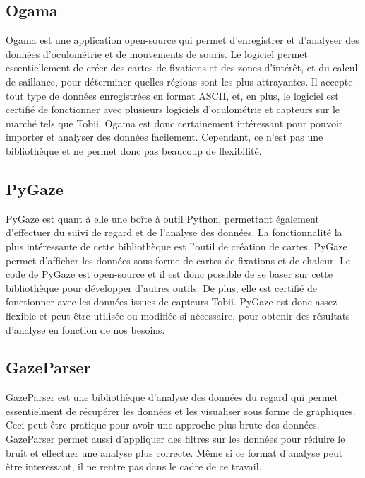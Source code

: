 \documentclass[hidelinks,12pt]{article}
\begin{document}
\subsection{Ogama}

Ogama \cite{ogama} est une application open-source qui permet d'enregistrer et
d'analyser des données d'oculométrie et de mouvements de souris. Le logiciel
permet essentiellement de créer des cartes de fixations et des zones d'intérêt,
et du calcul de saillance, pour déterminer quelles régions sont les plus
attrayantes. Il accepte tout type de données enregistrées en format ASCII, et,
en plus, le logiciel est certifié de fonctionner avec plusieurs logiciels
d'oculométrie et capteurs sur le marché tels que Tobii. Ogama est donc
certainement intéressant pour pouvoir importer et analyser des données
facilement. Cependant, ce n'est pas une bibliothèque et ne permet donc pas
beaucoup de flexibilité.

\subsection{PyGaze}

PyGaze \cite{pygaze} est quant à elle une boîte à outil Python, permettant
également d'effectuer du suivi de regard et de l'analyse des données. La
fonctionnalité la plus intéressante de cette bibliothèque est l'outil
de création de cartes. PyGaze permet d'afficher les données sous forme de
cartes de fixations et de chaleur. Le code de PyGaze est open-source et il est
donc possible de se baser sur cette bibliothèque pour développer d'autres
outils. De plus, elle est certifié de fonctionner avec les données issues de
capteurs Tobii. PyGaze est donc assez flexible et peut être utilisée ou
modifiée si nécessaire, pour obtenir des résultats d'analyse en fonction de nos
besoins.

\subsection{GazeParser}

GazeParser \cite{gazeparser} est une bibliothèque d'analyse des données du
regard qui permet essentielment de récupérer les données et les visualiser sous
forme de graphiques. Ceci peut être pratique pour avoir une approche plus brute
des données. GazeParser permet aussi d'appliquer des filtres sur les données
pour réduire le bruit et effectuer une analyse plus correcte. Même si ce format
d'analyse peut être interessant, il ne rentre pas dans le cadre de ce travail.
\end{document}
